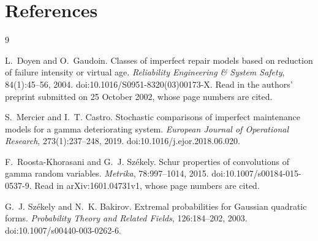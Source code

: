 \section*{References}

\begin{thebibliography}{9}

L.~Doyen and O.~Gaudoin.
\newblock Classes of imperfect repair models based on reduction of failure
  intensity or virtual age.
\newblock \emph{Reliability Engineering \& System Safety}, 84(1):45--56, 2004.
\newblock doi:10.1016/S0951-8320(03)00173-X. Read in the authors' preprint
  submitted on 25 October 2002, whose page numbers are cited.

S.~Mercier and I.~T. Castro.
\newblock Stochastic comparisons of imperfect maintenance models for a gamma
  deteriorating system.
\newblock \emph{European Journal of Operational Research}, 273(1):237--248,
  2019.
\newblock doi:10.1016/j.ejor.2018.06.020.

F.~Roosta-Khorasani and G.~J. Sz\'ekely.
\newblock Schur properties of convolutions of gamma random variables.
\newblock \emph{Metrika}, 78:997--1014, 2015.
\newblock doi:10.1007/s00184-015-0537-9. Read in arXiv:1601.04731v1, whose page
  numbers are cited.

G.~J. Sz\'ekely and N.~K. Bakirov.
\newblock Extremal probabilities for {G}aussian quadratic forms.
\newblock \emph{Probability Theory and Related Fields}, 126:184--202, 2003.
\newblock doi:10.1007/s00440-003-0262-6.

\end{thebibliography}
